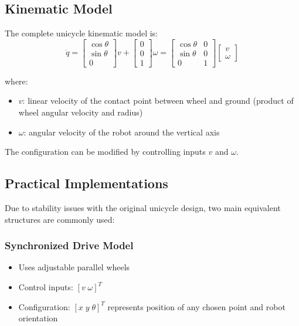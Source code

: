 \documentclass[openany]{book}
\theoremstyle{definition}
\theoremstyle{remark}
\begin{document}
\subsection{Kinematic Model}
The complete unicycle kinematic model is:
\begin{equation}
    \dot{q} = \begin{bmatrix}\cos \theta\\\sin \theta\\0\end{bmatrix}v + \begin{bmatrix}0\\0\\1\end{bmatrix}\omega = \begin{bmatrix}\cos \theta & 0\\\sin \theta & 0\\0 & 1\end{bmatrix}\begin{bmatrix}v\\\omega\end{bmatrix}
\end{equation}

where:
\begin{itemize}
    \item $v$: linear velocity of the contact point between wheel and ground (product of wheel angular velocity and radius)
    \item $\omega$: angular velocity of the robot around the vertical axis
\end{itemize}

The configuration can be modified by controlling inputs $v$ and $\omega$.

\subsection{Practical Implementations}
Due to stability issues with the original unicycle design, two main equivalent structures are commonly used:

\subsubsection{Synchronized Drive Model}
\begin{itemize}
    \item Uses adjustable parallel wheels
    \item Control inputs: $[v \; \omega]^T$
    \item Configuration: $[x \; y \; \theta]^T$ represents position of any chosen point and robot orientation
\end{itemize}
\end{document}
